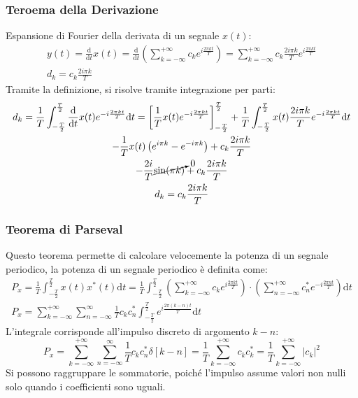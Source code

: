 \documentclass{article}
\newcommand{\df}{\mathrm{d}}
\numberwithin{equation}{subsection}
\begin{document}
\subsubsection{Teroema della Derivazione}

Espansione di Fourier della derivata di un segnale $x(t)$:
\begin{gather*}
    y(t)=\displaystyle\frac{\df}{\df t}x(t)=\frac{\df}{\df t}\left(\displaystyle\sum_{k=-\infty}^{+\infty}c_ke^{i\frac{2\pi kt}{T}}\right)=\sum_{k=-\infty}^{+\infty}c_k\frac{2i\pi k}{T}e^{i\frac{2\pi kt}{T}}\\
    d_k=c_k\displaystyle\frac{2i\pi k}{T}
\end{gather*}
Tramite la definizione, si risolve tramite integrazione per parti:
\begin{gather*}
    d_k=\displaystyle\frac{1}{T}\int_{-\frac{T}{2}}^{\frac{T}{2}}\frac{\df}{\df t}x(t)e^{-i\frac{2\pi kt}{T}}\df t=
    \left[\frac{1}{T}x(t)e^{-i\frac{2\pi kt}{T}}\right]_{-\frac{T}{2}}^{\frac{T}{2}}+\frac{1}{T}\int_{-\frac{T}{2}}^{\frac{T}{2}}x(t)\frac{2i\pi k}{T}e^{-i\frac{2\pi kt}{T}}\df t\\
    \displaystyle-\frac{1}{T}x(t)\left(e^{i\pi k}-e^{-i\pi k}\right)+c_k\frac{2i\pi k}{T}\\
    \displaystyle-\frac{2i}{T}\cancelto{0}{\sin(\pi k)}+c_k\frac{2i\pi k}{T}\\
    d_k=c_k\displaystyle\frac{2i\pi k}{T}
\end{gather*}

\subsubsection{Teorema di Parseval}

Questo teorema permette di calcolare velocemente la potenza di un segnale periodico, la potenza di un segnale periodico è definita come:
\begin{gather*}
    P_x=\displaystyle\frac{1}{T}\int_{-\frac{T}{2}}^{\frac{T}{2}}x(t)x^*(t)\df t=
    \frac{1}{T}\int_{-\frac{T}{2}}^{\frac{T}{2}}\left(\sum_{k=-\infty}^{+\infty}c_ke^{i\frac{2\pi kt}{T}}\right)\cdot\left(
    \sum_{n=-\infty}^{+\infty}c_n^*e^{-i\frac{2\pi nt}{T}}\right)\df t\\
    P_x=\displaystyle\sum_{k=-\infty}^{+\infty}\sum_{n=-\infty}^{\infty}\frac{1}{T}c_kc^*_n\int_{-\frac{T}{2}}^{\frac{T}{2}}e^{i\frac{2\pi (k-n)t}{T}}\df t
\end{gather*}
L'integrale corrisponde all'impulso discreto di argomento $k-n$:
\begin{equation*}
    P_x=\displaystyle\sum_{k=-\infty}^{+\infty}\sum_{n=-\infty}^{\infty}\frac{1}{T}c_kc_n^*\delta[k-n]=\frac{1}{T}\sum_{k=-\infty}^{+\infty}c_kc_k^*=\frac{1}{T}\sum_{k=-\infty}^{+\infty}|c_k|^2
\end{equation*}
Si possono raggruppare le sommatorie, poiché l'impulso assume valori non nulli solo quando i coefficienti sono uguali. 
\end{document}
